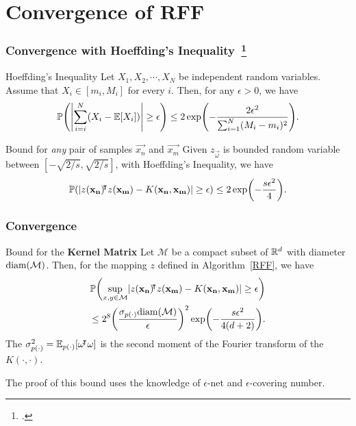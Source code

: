 \documentclass[10pt]{../formats/RU}
\begin{document}
\section{Convergence of RFF}
\begin{frame}
  \frametitle{Convergence with Hoeffding's Inequality~\footcite{vershynin_hdp}}
  \begin{block}{Hoeffding's Inequality}
    Let $X_1, X_2,\cdots, X_N$ be independent random variables. Assume that $X_i \in [m_i, M_i]$ for every $i$. Then, for any $\epsilon > 0$, we have
    \[
    \P{\abs*{\sum_{i=i}^{N}(X_i-\E{X_i})}\geq \epsilon} \leq 2\exp\parens*{-\frac{2\epsilon^2}{\sum_{i=1}^{N}(M_i-m_i)^2}}.
    \]
  \end{block}
  \begin{exampleblock}{Bound for \emph{any} pair of samples $\vec{x_n}$ and $\vec{x_m}$}
    Given $z_{\vec{\omega}}$ is bounded random variable between $[-\sqrt{2/s}, \sqrt{2/s}]$, with Hoeffding's Inequality, we have
    \begin{align*}
      \P{\abs{z(\vec{x_n})\trn z(\vec{x_m})-K(\vec{x_n}, \vec{x_m})}\geq \epsilon} \leq 2\exp\parens*{-\frac{s\epsilon^2}{4}}.
    \end{align*}
  \end{exampleblock}
\end{frame}
\begin{frame}
  \frametitle{Convergence}
  \begin{exampleblock}{Bound for the \textbf{Kernel Matrix}}
    Let $\mathcal{M}$ be a compact subset of $\mathbb{R}^d$ with diameter $\textnormal{diam}(\mathcal{M})$. Then, for the mapping $z$ defined in Algorithm~\ref{RFF}, we have
    \begin{align*}
      \P{\sup_{x,y\in\mathcal{M}}\abs{z(\vec{x_n})\trn z(\vec{x_m})-K(\vec{x_n}, \vec{x_m})}\geq \epsilon} \\
      \leq 2^8\parens*{\frac{\sigma_{p(\cdot)}\textnormal{diam}(\mathcal{M})}{\epsilon}}^2\exp\parens*{-\frac{s\epsilon^2}{4(d+2)}}.
    \end{align*}
    The $\sigma_{p(\cdot)}^2=\mathbb{E}_{p(\cdot)}\bracks*{\vec{\omega}\trn\vec{\omega}}$ is the second moment of the Fourier transform of the $K(\cdot,\cdot)$.
  \end{exampleblock}
  The proof of this bound uses the knowledge of $\epsilon$-net and $\epsilon$-covering number.
\end{frame}
\end{document}
